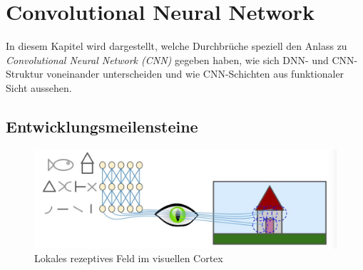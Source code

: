 \chapter{Convolutional Neural Network} \label{chap:cnn}


In diesem Kapitel wird dargestellt, welche Durchbrüche speziell den Anlass zu \emph{Convolutional Neural Network (CNN)} gegeben haben, wie sich DNN- und CNN-Struktur voneinander unterscheiden und wie CNN-Schichten aus funktionaler Sicht aussehen.

\section{Entwicklungsmeilensteine}

\begin{figure}[!hb]
	\centering
	\includegraphics[width=\linewidth]{images/local_receptive_field}
	\caption{Lokales rezeptives Feld im visuellen Cortex \protect\cite{LocalReceptiveField}}
	\label{fig:1959CatExpr}
\end{figure}

